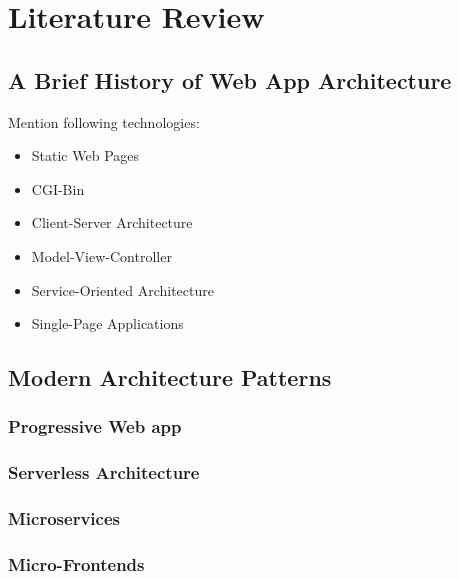 \chapter{Literature Review}
\label{chap:Literature-Review} 

\section{A Brief History of Web App Architecture}
Mention following technologies:
\begin{itemize}
   \item Static Web Pages
   \item CGI-Bin
   \item Client-Server Architecture
   \item Model-View-Controller 
   \item Service-Oriented Architecture
   \item Single-Page Applications
\end{itemize}

\section{Modern Architecture Patterns}
\subsection{Progressive Web app}
\subsection{Serverless Architecture}
\subsection{Microservices}
\subsection{Micro-Frontends}